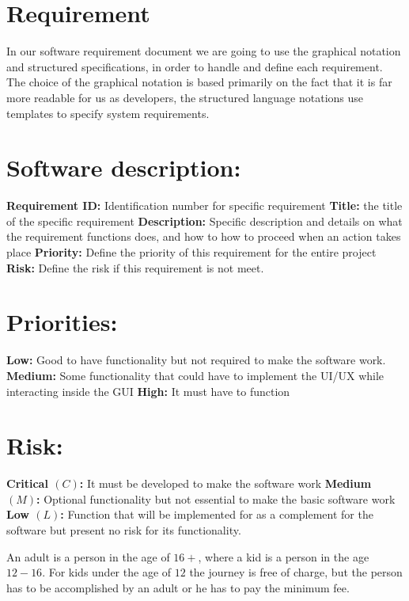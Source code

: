 \section*{Requirement}
In our software requirement document we are going to use the graphical notation and structured specifications, in order to handle and define each requirement. The choice of the graphical notation is based primarily on the fact that it is far more readable for us as developers, the structured language notations use templates to specify system
requirements.


\section*{Software description:}
\textbf{Requirement ID:} Identification number for specific requirement
\textbf{Title:} the title of the specific requirement
\textbf{Description:} Specific description and details on what the requirement functions does, and how to how to proceed when an action takes place
\textbf{Priority:} Define the priority of this requirement for the entire project
\textbf{Risk:} Define the risk if this requirement is not meet.

\section*{Priorities:}
\textbf{Low:} Good to have functionality but not required to make the software work.
\textbf{Medium:} Some functionality that could have to implement the UI/UX while interacting inside the GUI
\textbf{High:} It must have to function

\section*{Risk:}
\textbf{Critical $(C)$:} It must be developed to make the software work
\textbf{Medium $(M)$:} Optional functionality but not essential to make the basic software work
\textbf{Low $(L)$:} Function that will be implemented for as a complement for the software but present no risk for its functionality. 

An adult is a person in the age of $16+$, where a kid is a person in the age $12 - 16$. For kids under the age of $12$ the journey is free of charge, but the person has to be accomplished by an adult or he has to pay the minimum fee.

